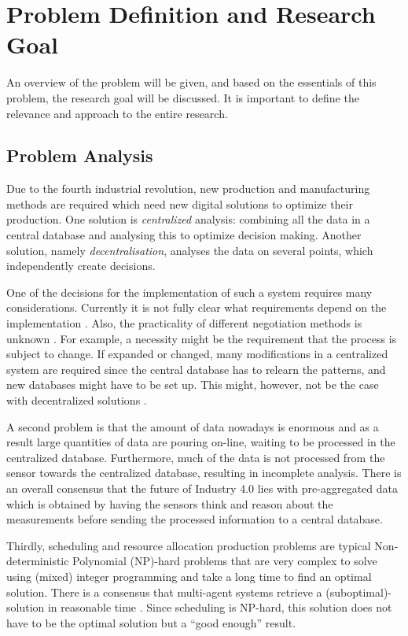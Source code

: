\chapter{Problem Definition and Research Goal}
\label{chp:problem}
An overview of the problem will be given, and based on the essentials of this problem, the research goal will be discussed. It is important to define the relevance and approach to the entire research.

\section{Problem Analysis}
Due to the fourth industrial revolution, new production and manufacturing methods are required which need new digital solutions to optimize their production. One solution is \textit{centralized} analysis: combining all the data in a central database and analysing this to optimize decision making. Another solution, namely \textit{decentralisation}, analyses the data on several points, which independently create decisions.

One of the decisions for the implementation of such a system requires many considerations. Currently it is not fully clear what requirements depend on the implementation \citep{leitao2016smart}. Also, the practicality of different negotiation methods is unknown \citep{fatima2014principles}. For example, a necessity might be the requirement that the process is subject to change. If expanded or changed, many modifications in a centralized system are required since the central database has to relearn the patterns, and new databases might have to be set up. This might, however, not be the case with decentralized solutions \citep{leitao2015industrial}. %

A second problem is that the amount of data nowadays is enormous and as a result large quantities of data are pouring on-line, waiting to be processed in the centralized database. Furthermore, much of the data is not processed from the sensor towards the centralized database, resulting in incomplete analysis. There is an overall consensus that the future of Industry 4.0 lies with pre-aggregated data \citep{deloitte2015connected} which is obtained by having the sensors think and reason about the measurements before sending the processed information to a central database.

Thirdly, scheduling and resource allocation production problems are typical Non-deterministic Polynomial (NP)-hard problems that are very complex to solve using (mixed) integer programming and take a long time to find an optimal solution. There is a consensus that multi-agent systems retrieve a (suboptimal)-solution in reasonable time \citep{konolige1980multiple}. Since scheduling is NP-hard, this solution does not have to be the optimal solution but a ``good enough'' result.

